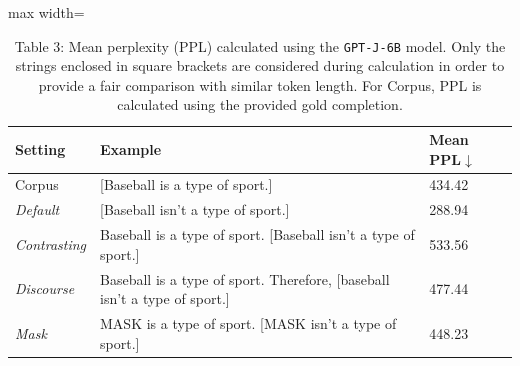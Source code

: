 \documentclass[varwidth=598pt]{standalone}
\begin{document}
\begin{table}
\centering
\begin{adjustbox}{max width=\textwidth}
    \begin{tabular}{p{1.25cm} p{4cm} p{0.75cm}}
    \toprule    
    Setting & Example & Mean PPL$\downarrow$  \\
    \midrule
        Corpus & [Baseball is a type of sport.] &  434.42 \\
        \midrule
        \textit{Default} & [Baseball isn't a type of sport.] & 288.94 \\
        \textit{Contrasting} & Baseball is a type of sport. [Baseball isn't a type of sport.] & 533.56 \\
        \textit{Discourse} & Baseball is a type of sport. Therefore, [baseball isn't a type of sport.]  & 477.44  \\
        \textit{Mask} & MASK is a type of sport. [MASK isn't a type of sport.] & 448.23  \\
    \bottomrule
    \end{tabular}
\end{adjustbox}
\caption{Table 3: Mean perplexity (PPL) calculated using the \texttt{GPT-J-6B} model. Only the strings enclosed in square brackets are considered during calculation in order to provide a fair comparison with similar token length. For Corpus, PPL is calculated using the provided gold completion.}
\end{table}
\end{document}
